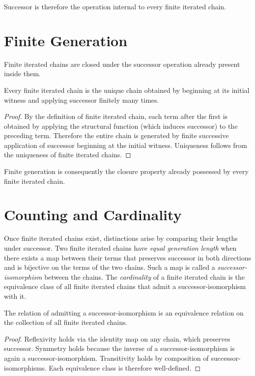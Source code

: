 \documentclass[12pt,anyside]{book}
\newcommand{\term}[1]{\textit{#1}}             %
\begin{document}
Successor is therefore the operation internal to every finite iterated chain.

\section{Finite Generation}
Finite iterated chains are closed under the successor operation already present inside them.

\begin{theorem}
Every finite iterated chain is the unique chain obtained by beginning at its initial witness and applying successor finitely many times.
\end{theorem}

\begin{proof}
By the definition of finite iterated chain, each term after the first is obtained by applying the structural function (which induces successor) to the preceding term. Therefore the entire chain is generated by finite successive application of successor beginning at the initial witness. Uniqueness follows from the uniqueness of finite iterated chains.
\end{proof}

Finite generation is consequently the closure property already possessed by every finite iterated chain.

\section{Counting and Cardinality}
Once finite iterated chains exist, distinctions arise by comparing their lengths under successor. Two finite iterated chains have \term{equal generation length} when there exists a map between their terms that preserves successor in both directions and is bijective on the terms of the two chains. Such a map is called a \term{successor-isomorphism} between the chains. The \term{cardinality} of a finite iterated chain is the equivalence class of all finite iterated chains that admit a successor-isomorphism with it.

\begin{theorem}
The relation of admitting a successor-isomorphism is an equivalence relation on the collection of all finite iterated chains.
\end{theorem}

\begin{proof}
Reflexivity holds via the identity map on any chain, which preserves successor. Symmetry holds because the inverse of a successor-isomorphism is again a successor-isomorphism. Transitivity holds by composition of successor-isomorphisms. Each equivalence class is therefore well-defined.
\end{proof}
\end{document}
